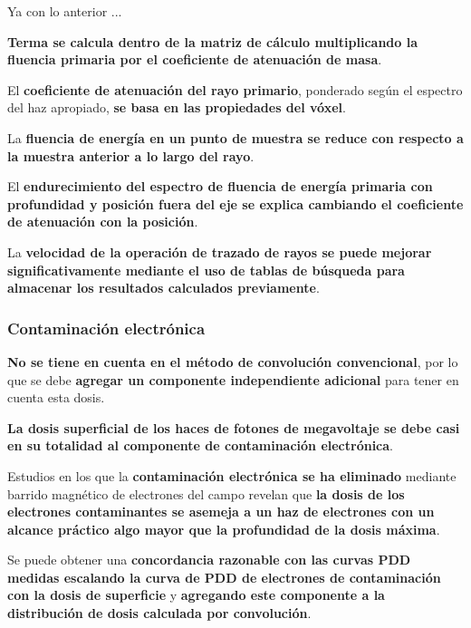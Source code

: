 \documentclass[aspectratio=169,xcolor=dvipsnames,t]{beamer}
\begin{document}
\begin{frame}

    Ya con lo anterior ...

    \textbf{Terma se calcula dentro de la matriz de cálculo multiplicando la fluencia primaria por el coeficiente de atenuación de masa}. 
    
    El \textbf{coeficiente de atenuación del rayo primario}, ponderado según el espectro del haz apropiado, \textbf{se basa en las propiedades del vóxel}. 
    
    La \textbf{fluencia de energía en un punto de muestra se reduce con respecto a la muestra anterior a lo largo del rayo}. 
    
    El \textbf{endurecimiento del espectro de fluencia de energía primaria con profundidad y posición fuera del eje se explica cambiando el coeficiente de atenuación con la posición}. 
    
    La \textbf{velocidad de la operación de trazado de rayos se puede mejorar significativamente mediante el uso de tablas de búsqueda para almacenar los resultados calculados previamente}.

\end{frame}

\begin{frame}

    \frametitle{Contaminación electrónica}

    \textbf{No se tiene en cuenta en el método de convolución convencional}, por lo que se debe \textbf{agregar un componente independiente adicional} para tener en cuenta esta dosis.

    \textbf{La dosis superficial de los haces de fotones de megavoltaje se debe casi en su totalidad al componente de contaminación electrónica}. 

    Estudios en los que la \textbf{contaminación electrónica se ha eliminado} mediante barrido magnético de electrones del campo revelan que \textbf{la dosis de los electrones contaminantes se asemeja a un haz de electrones con un alcance práctico algo mayor que la profundidad de la dosis máxima}.

    Se puede obtener una \textbf{concordancia razonable con las curvas PDD medidas escalando la curva de PDD de electrones de contaminación con la dosis de superficie} y \textbf{agregando este componente a la distribución de dosis calculada por convolución}.

\end{frame}
\end{document}

